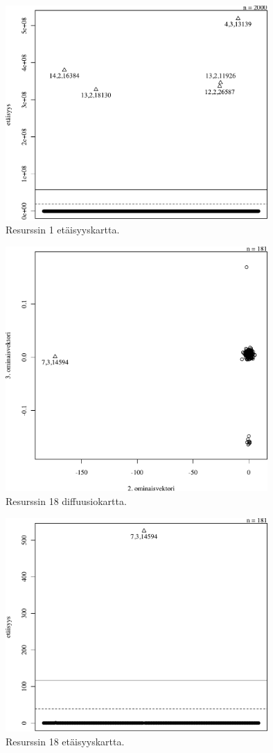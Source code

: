 \begin{figure}[p]
\centering
\includegraphics[width=10cm]{pics/tiheyskuvat/service_1.pdf}
\caption{Resurssin 1 etäisyyskartta.}
\label{service_1}
\end{figure}

\begin{figure}[p]
\centering
\includegraphics[width=10cm]{pics/diffuusiokuvat/service_18.pdf}
\caption{Resurssin 18 diffuusiokartta.}
\label{diffusio_18}
\end{figure}

\begin{figure}[p]
\centering
\includegraphics[width=10cm]{pics/tiheyskuvat/service_18.pdf}
\caption{Resurssin 18 etäisyyskartta.}
\label{service_18}
\end{figure}


